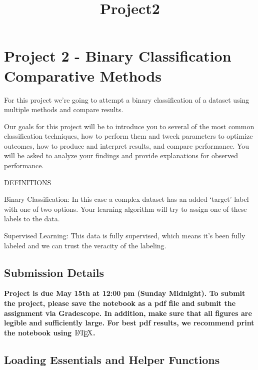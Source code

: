 \documentclass[11pt]{article}
\title{Project2}
\let\Oldlatex\LaTeX
\renewcommand{\LaTeX}{\textrm{\Oldlatex}}
\begin{document}
    
    \maketitle
    
    

    
    \hypertarget{project-2---binary-classification-comparative-methods}{%
\section{Project 2 - Binary Classification Comparative
Methods}\label{project-2---binary-classification-comparative-methods}}

    For this project we're going to attempt a binary classification of a
dataset using multiple methods and compare results.

Our goals for this project will be to introduce you to several of the
most common classification techniques, how to perform them and tweek
parameters to optimize outcomes, how to produce and interpret results,
and compare performance. You will be asked to analyze your findings and
provide explanations for observed performance.

DEFINITIONS

Binary Classification: In this case a complex dataset has an added
`target' label with one of two options. Your learning algorithm will try
to assign one of these labels to the data.

Supervised Learning: This data is fully supervised, which means it's
been fully labeled and we can trust the veracity of the labeling.

    \hypertarget{submission-details}{%
\subsection{Submission Details}\label{submission-details}}

\textbf{Project is due May 15th at 12:00 pm (Sunday Midnight). To submit
the project, please save the notebook as a pdf file and submit the
assignment via Gradescope. In addition, make sure that all figures are
legible and suﬀiciently large. For best pdf results, we recommend print
the notebook using \href{https://www.latex-project.org/}{\(\LaTeX\)}.}

    \hypertarget{loading-essentials-and-helper-functions}{%
\subsection{Loading Essentials and Helper
Functions}\label{loading-essentials-and-helper-functions}}
\end{document}
